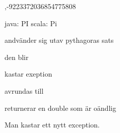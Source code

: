 ,-9223372036854775808

\Task %

\Subtask 
java: PI scala: Pi

\Subtask andvänder sig utav pythagoras sats

\Subtask {}

\Task %

\Subtask den blir 

\Subtask kastar exeption

\Subtask {}

\Subtask avrundas till 

\Subtask {}

\Subtask returnerar en double som är oändlig

\Subtask {}

\Subtask {}

\Subtask {}

\Subtask Man kastar ett nytt exception.

\Task %

\Subtask {}

\Subtask {}

\Subtask {}

\Subtask {}

\Subtask {}

\Subtask {}

\Subtask {}

\Subtask {}

\Subtask {}

\Subtask {}

\Subtask {}

\Subtask {}

\Subtask {}

\Subtask {}

\Subtask {}

\Subtask {}

\Subtask {}

\Subtask {}

\Subtask {}

\Subtask {}

\Subtask {}

\Subtask {}

\Task %

